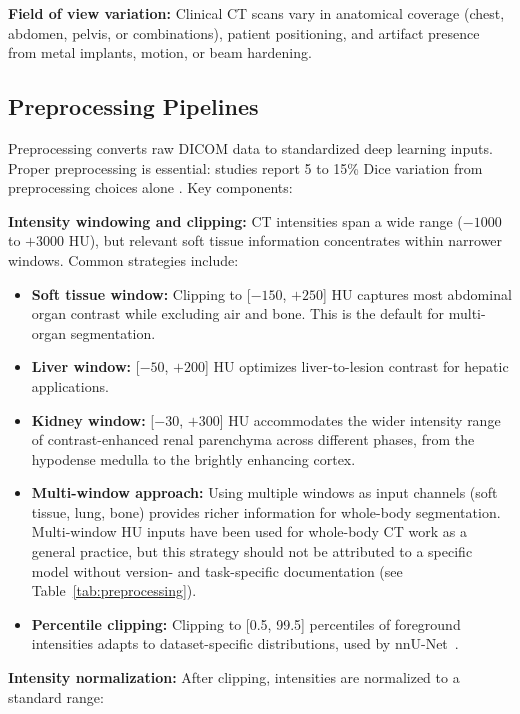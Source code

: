 \textbf{Field of view variation:} Clinical CT scans vary in anatomical coverage (chest, abdomen, pelvis, or combinations), patient positioning, and artifact presence from metal implants, motion, or beam hardening.

\subsection{Preprocessing Pipelines}
\label{sec:preprocessing}

Preprocessing converts raw DICOM data to standardized deep learning inputs. Proper preprocessing is essential: studies report 5 to 15\% Dice variation from preprocessing choices alone \cite{isensee2021nnunet}. Key components:

\textbf{Intensity windowing and clipping:} CT intensities span a wide range ($-1000$ to $+3000$ HU), but relevant soft tissue information concentrates within narrower windows. Common strategies include:

\begin{itemize}
    \item \textbf{Soft tissue window:} Clipping to [$-150$, $+250$] HU captures most abdominal organ contrast while excluding air and bone. This is the default for multi-organ segmentation.
    \item \textbf{Liver window:} [$-50$, $+200$] HU optimizes liver-to-lesion contrast for hepatic applications.
    \item \textbf{Kidney window:} [$-30$, $+300$] HU accommodates the wider intensity range of contrast-enhanced renal parenchyma across different phases, from the hypodense medulla to the brightly enhancing cortex.
    \item \textbf{Multi-window approach:} Using multiple windows as input channels (soft tissue, lung, bone) provides richer information for whole-body segmentation. Multi-window HU inputs have been used for whole-body CT work as a general practice, but this strategy should not be attributed to a specific model without version- and task-specific documentation (see Table~\ref{tab:preprocessing}).
    \item \textbf{Percentile clipping:} Clipping to [0.5, 99.5] percentiles of foreground intensities adapts to dataset-specific distributions, used by nnU-Net~\cite{isensee2021nnunet}.
\end{itemize}

\textbf{Intensity normalization:} After clipping, intensities are normalized to a standard range:


